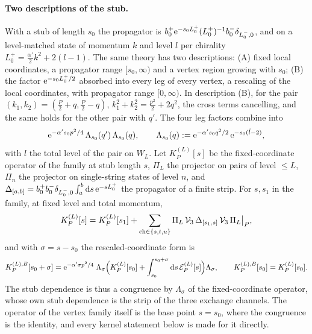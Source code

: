 \paragraph{Two descriptions of the stub.}
With a stub of length $s_0$ the propagator is $b_0^+ \mathrm{e}^{- s_0 L_0^+} (L_0^+)^{-1} b_0^- \delta_{L_0^-, 0}$, and on a level-matched state of momentum $k$ and level $l$ per chirality $L_0^+ = \tfrac{\alpha'}{2} k^2 + 2 (l - 1)$.
The same theory has two descriptions: (A) fixed local coordinates, a propagator range $[s_0, \infty)$ and a vertex region growing with $s_0$; (B) the factor $\mathrm{e}^{- s_0 L_0^+ / 2}$ absorbed into every leg of every vertex, a rescaling of the local coordinates, with propagator range $[0, \infty)$.
In description (B), for the pair $(k_1, k_2) = (\tfrac{P}{2} + q, \tfrac{P}{2} - q)$, $k_1^2 + k_2^2 = \tfrac{p^2}{2} + 2 q^2$, the cross terms cancelling, and the same holds for the other pair with $q'$.
The four leg factors combine into
\begin{equation}
  \label{eq:mom:leg-factor}
  \mathrm{e}^{- \alpha' s_0 p^2 / 4} \, \Lambda_{s_0}(q') \, \Lambda_{s_0}(q),
  \qquad
  \Lambda_{s_0}(q)
    := \mathrm{e}^{- \alpha' s_0 q^2 / 2} \, \mathrm{e}^{- s_0 (\hat l - 2)},
\end{equation}
with $\hat l$ the total level of the pair on $W_L$.
Let $K^{(L)}_P[s]$ be the fixed-coordinate operator of the family at stub length $s$, $\Pi_L$ the projector on pairs of level $\le L$, $\Pi_n$ the projector on single-string states of level $n$, and $\Delta_{[a, b]} = b_0^+ b_0^- \delta_{L_0^-, 0} \int_a^b \mathrm{d} s \, \mathrm{e}^{- s L_0^+}$ the propagator of a finite strip.
For $s, s_1$ in the family, at fixed level and total momentum,
\begin{equation}
  \label{eq:mom:strip}
  K^{(L)}_P[s]
    = K^{(L)}_P[s_1] + \sum_{{\rm ch} \in \{s, t, u\}} \Pi_L \, \mathcal{V}_{3} \, \Delta_{[s_1, s]} \, \mathcal{V}_{3} \, \Pi_L \big|_P,
\end{equation}
and with $\sigma = s - s_0$ the rescaled-coordinate form is
\begin{equation}
  \label{eq:mom:congruence}
  K^{(L), B}_P[s_0 + \sigma]
    = \mathrm{e}^{- \alpha' \sigma p^2 / 4} \; \Lambda_\sigma \Big( K^{(L)}_P[s_0] + \int_{s_0}^{s_0 + \sigma} \mathrm{d} s \, \mathcal E^{(L)}_P[s] \Big) \Lambda_\sigma,
  \qquad
  K^{(L), B}_P[s_0]
    = K^{(L)}_P[s_0].
\end{equation}
The stub dependence is thus a congruence by $\Lambda_\sigma$ of the fixed-coordinate operator, whose own stub dependence is the strip of the three exchange channels.
The operator of the vertex family itself is the base point $s = s_0$, where the congruence is the identity, and every kernel statement below is made for it directly.

